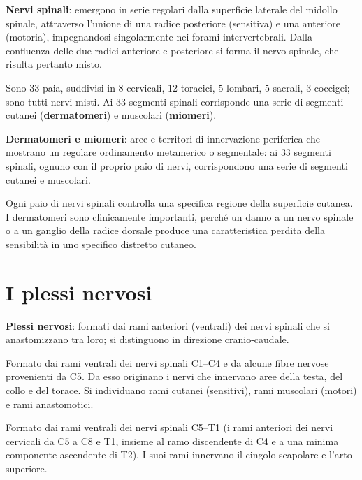\textbf{Nervi spinali}: emergono in serie regolari dalla superficie laterale
del midollo spinale, attraverso l'unione di una radice posteriore
(sensitiva) e una anteriore (motoria), impegnandosi singolarmente nei forami
intervertebrali. Dalla confluenza delle due radici anteriore e posteriore si
forma il nervo spinale, che risulta pertanto misto.

Sono $33$ paia, suddivisi in $8$ cervicali, $12$ toracici, $5$ lombari, $5$
sacrali, $3$ coccigei; sono tutti nervi misti. Ai $33$ segmenti spinali
corrisponde una serie di segmenti cutanei (\textbf{dermatomeri}) e
muscolari (\textbf{miomeri}).

\textbf{Dermatomeri e miomeri}: aree e territori di innervazione periferica
che mostrano un regolare ordinamento metamerico o segmentale: ai $33$
segmenti spinali, ognuno con il proprio paio di nervi, corrispondono una
serie di segmenti cutanei e muscolari.

Ogni paio di nervi spinali controlla una specifica regione della superficie
cutanea. I dermatomeri sono clinicamente importanti, perché un danno a un
nervo spinale o a un ganglio della radice dorsale produce una caratteristica
perdita della sensibilità in uno specifico distretto cutaneo.

\section{I plessi nervosi}

\textbf{Plessi nervosi}: formati dai rami anteriori (ventrali) dei nervi
spinali che si anastomizzano tra loro; si distinguono in direzione
cranio-caudale.

Formato dai rami ventrali dei nervi spinali C1--C4 e da alcune fibre nervose
provenienti da C5. Da esso originano i nervi che innervano aree della testa,
del collo e del torace. Si individuano rami cutanei (sensitivi), rami
muscolari (motori) e rami anastomotici.

Formato dai rami ventrali dei nervi spinali C5--T1 (i rami anteriori dei
nervi cervicali da C5 a C8 e T1, insieme al ramo discendente di C4 e a una
minima componente ascendente di T2). I suoi rami innervano il cingolo
scapolare e l'arto superiore.


